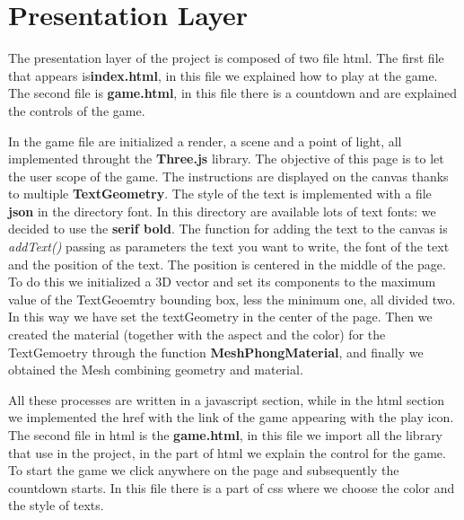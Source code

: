 \documentclass[a4paper, 11pt, titlepage]{report}
\begin{document}
\chapter{Presentation Layer}
	\par The presentation layer of the project is composed of two file html. The first file that appears is\textbf{index.html}, in  this file we explained how to play at the game. The second file is \textbf{game.html}, in this file there is a countdown and are explained the controls of the game. \\
	\par In the game file are initialized a render, a scene and a point of light, all implemented throught the \textbf{Three.js} library. The objective of this page is to let the user scope of the game. The instructions are displayed on the canvas thanks to multiple \textbf{TextGeometry}.
	The style of the text is implemented with a file \textbf{json} in the directory font.
	In this directory are available lots of text fonts: we decided to use the \textbf{serif bold}. The function for adding the text to the canvas is \emph{addText()} passing as parameters the text you want to write, the font of the text and the position of the text. The position is centered in the middle of the page. To do this we initialized a 3D vector and set its components to the maximum value of the TextGeoemtry bounding box, less the minimum one, all divided two. In this way we have set the textGeometry in the center of the page.
	Then we created the material (together with the aspect and the color) for the TextGemoetry through the function \textbf{MeshPhongMaterial}, and finally we obtained the Mesh combining geometry and material. \\
	\par All these processes are written in a javascript section, while in the html section we implemented the href with the link of the game appearing with the play icon.
	The second file in html is the \textbf{game.html}, in this file we import all the library that use in the project, in the part of html we explain the control for the game. To start the game we click anywhere on the page and subsequently the countdown starts. In this file there is a part of css where we choose the color and the style of texts.

\end{document}

